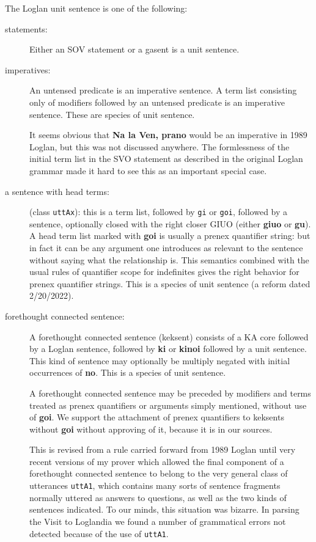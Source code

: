 \documentclass[12pt]{book}
\begin{document}
{The Loglan unit sentence is one of the following:

\begin{description}

\item[statements:]  Either an SOV statement or a gasent is a unit sentence.

\item[imperatives:]  An untensed predicate is an imperative sentence.  A term list consisting only of modifiers followed by an untensed predicate is an imperative sentence.  These are species of unit sentence.

It seems obvious that
{\bf Na la Ven, prano}
would be an imperative in 1989 Loglan, but this was not discussed anywhere.  The formlessness of the initial term list in the SVO statement as described in the original Loglan grammar made it hard to see this as an important special case.

\item[a sentence with head terms:]  (class {\tt uttAx}):  this is a term list, followed by
{\tt gi} or {\tt goi}, followed by a sentence, optionally closed with the right closer GIUO (either {\bf giuo} or {\bf gu}).   A head term list marked
with {\bf goi} is usually a prenex quantifier string:  but in fact it can be any argument one introduces as relevant to the sentence without saying what the relationship is.  This semantics combined with the usual rules of quantifier scope
for indefinites gives the right behavior for prenex quantifier strings.  This is a species of unit sentence (a reform dated 2/20/2022).

\item[forethought connected sentence:]  A forethought connected sentence (keksent) consists of a KA core followed by a Loglan sentence, followed by {\bf ki} or {\bf kinoi} followed by a unit sentence.  This kind of sentence may optionally be multiply negated with initial occurrences of {\bf no}.  This is a species of unit sentence.

A forethought connected sentence may be preceded by modifiers and terms treated as prenex quantifiers or arguments simply mentioned, without use of {\bf goi}.  We support the attachment of prenex quantifiers to keksents without {\bf goi} without approving of it, because it is in our sources.

This is revised from a rule carried forward from 1989 Loglan until very recent versions of my prover which allowed the final component of a forethought connected sentence to belong to the very general class of utterances {\tt uttA1}, which contains many sorts of sentence fragments normally uttered as answers to questions, as well as the two kinds of sentences indicated.  To our minds, this situation was bizarre.  In parsing the Visit to Loglandia we found a number of grammatical errors not detected because of the use of {\tt uttA1}.


\end{description}}
\end{document}
